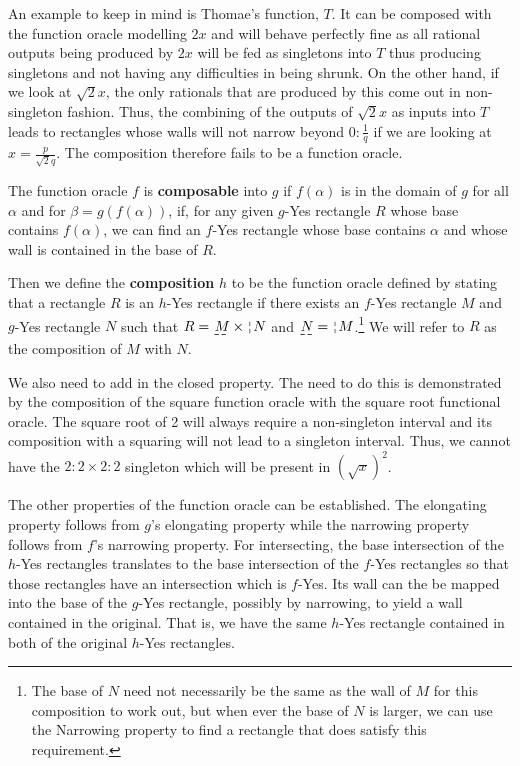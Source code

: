 \documentclass[12pt]{article}
\begin{document}
An example to keep in mind is Thomae's function, $T$. It can be composed with the function oracle modelling $2x$ and will behave perfectly fine as all rational outputs being produced by $2x$ will be fed as singletons into $T$ thus producing singletons and not having any difficulties in being shrunk.  On the other hand, if we look at $\sqrt{2} x$, the only rationals that are produced by this come out in non-singleton fashion. Thus, the combining of the outputs of $\sqrt{2} x$ as inputs into $T$ leads to rectangles whose walls will not narrow beyond $0:\frac{1}{q}$ if we are looking at $x = \frac{p}{\sqrt{2} q}$. The composition therefore fails to be a function oracle. 

The function oracle $f$ is \textbf{composable} into $g$ if $f(\alpha)$ is in the domain of $g$ for all $\alpha$ and for $\beta = g(f(\alpha))$, if, for any given $g$-Yes rectangle $R$ whose base contains $f(\alpha)$, we can find an $f$-Yes rectangle whose base contains $\alpha$ and whose wall is contained in the base of $R$.  

Then we define the \textbf{composition} $h$ to be the function oracle defined by stating that a rectangle $R$ is an $h$-Yes rectangle if there exists an $f$-Yes rectangle $M$ and $g$-Yes rectangle $N$  such that $R = \base{M} \times \wall{N}$ and $\base{N} = \wall{M}$.\footnote{The base of $N$ need not necessarily be the same as the wall of $M$ for this composition to work out, but when ever the base of $N$ is larger, we can use the Narrowing property to find a rectangle that does satisfy this requirement.} We will refer to $R$ as the composition of $M$ with $N$. 

We also need to add in the closed property. The need to do this is demonstrated by the composition of the square function oracle with the square root functional oracle. The square root of 2 will always require a non-singleton interval and its composition with a squaring will not lead to a singleton interval. Thus, we cannot have the $2:2 \times 2:2$ singleton which will be present in $(\sqrt{x})^2$.

The other properties of the function oracle can be established. The elongating property follows from $g$'s elongating property while the narrowing property follows from $f$'s narrowing property. For intersecting, the base intersection of the $h$-Yes rectangles translates to the base intersection of the $f$-Yes rectangles so that those rectangles have an intersection which is $f$-Yes. Its wall can the be mapped into the base of the $g$-Yes rectangle, possibly by narrowing, to yield a wall contained in the original. That is, we have the same $h$-Yes rectangle contained in both of the original $h$-Yes rectangles. 
\end{document}
